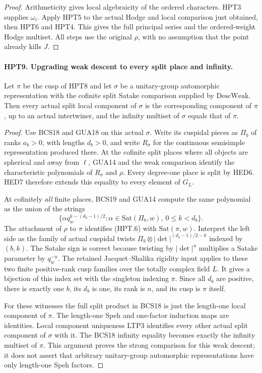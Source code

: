 \documentclass[11pt,a4paper]{article}
\numberwithin{equation}{section}
\theoremstyle{remark}\newtheorem{remark}[theorem]{Remark}
\begin{document}
\begin{proof}
Arithmeticity gives local algebraicity of the ordered characters.
HPT3 supplies $\omega_i$.  Apply HPT5 to the actual Hodge and
local comparison just obtained, then HPT6 and HPT4.
This gives the full principal series and the ordered-weight
Hodge multiset.  All steps use the original $\rho$, with no
assumption that the point already kills $J$.
\end{proof}

\paragraph{HPT9. Upgrading weak descent to every split place and infinity.}
\label{claim:HPT9}
Let $\pi$ be the cusp of HPT8 and let $\sigma$ be a unitary-group
automorphic representation with the cofinite split Satake
comparison supplied by $\mathrm{DescWeak}$.  Then every actual
split local component of $\sigma$ is the corresponding component
of $\pi$, up to an actual intertwiner, and the infinity multiset
of $\sigma$ equals that of $\pi$.
\begin{proof}
Use BCS18 and GUA18 on this actual $\sigma$.  Write its cuspidal
pieces as $\Pi_b$ of ranks $a_b>0$, with lengths $d_b>0$, and
write $R_\sigma$ for the continuous semisimple representation
produced there.  At the cofinite split places where all objects
are spherical and away from $\ell$, GUA14 and the weak comparison
identify the characteristic polynomials of $R_\sigma$ and
$\rho$.  Every degree-one place is split by HED6.  HED7 therefore
extends this equality to every element of $G_L$.

At cofinitely \emph{all} finite places, BCS19 and GUA14 compute
the same polynomial as the union of the strings
\[
       \{\alpha q_w^{k-(d_b-1)/2}:
                  \alpha\in\mathrm{Sat}(\Pi_b,w),\ 0\leq k<d_b\}.
                                                               \tag{HPT.6}
\]
The attachment of $\rho$ to $\pi$ identifies (HPT.6) with
$\mathrm{Sat}(\pi,w)$.  Interpret the left side as the family
of actual cuspidal twists
$\Pi_b\otimes|\det|^{(d_b-1)/2-k}$ indexed by $(b,k)$.
The Satake sign is correct because twisting by $|\det|^u$
multiplies a Satake parameter by $q_w^{-u}$.
The retained Jacquet--Shalika rigidity input applies to these
two finite positive-rank cusp families over the totally complex
field $L$.  It gives a bijection of this index set with the
singleton indexing $\pi$.  Since all $d_b$ are positive, there
is exactly one $b$, its $d_b$ is one, its rank is $n$, and
its cusp is $\pi$ itself.

For these witnesses the full split product in BCS18 is just the
length-one local component of $\pi$.  The length-one Speh and
one-factor induction maps are identities.  Local component
uniqueness LTP3 identifies every other actual split component
of $\sigma$ with it.  The BCS18 infinity equality becomes
exactly the infinity multiset of $\pi$.  This argument proves
the strong comparison for this weak descent; it does not assert
that arbitrary unitary-group automorphic representations have
only length-one Speh factors.
\end{proof}
\end{document}
